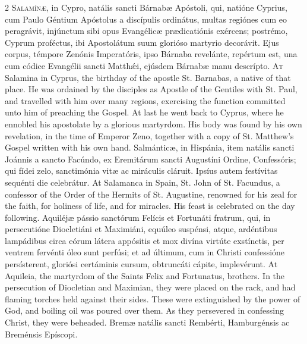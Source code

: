 \begin{paracol}{2}
\lettrine[lines=2]{S}{alamínæ,} in Cypro, 
 natális sancti Bárnabæ Apóstoli, qui, natióne Cyprius, cum Paulo Géntium 
 Apóstolus a discípulis ordinátus, multas regiónes cum eo peragrávit, 
 injúnctum sibi opus Evangélicæ prædicatiónis exércens; postrémo, Cyprum 
 proféctus, ibi Apostolátum suum glorióso martyrio decorávit. Ejus 
 corpus, témpore Zenónis Imperatóris, ipso Bárnaba revelánte, repértum est, 
 una cum códice Evangélii sancti Matthǽi, ejúsdem Bárnabæ manu descrípto.
\switchcolumn
{}
\lettrine[lines=2]{A}{t} Salamina in Cyprus, the birthday 
 of the apostle St. Barnabas, a native of that place. He was ordained 
 by the disciples as Apostle of the Gentiles with St. Paul, and travelled 
 with him over many regions, exercising the function committed unto him of 
 preaching the Gospel. At last he went back to Cyprus, where he 
 ennobled his apostolate by a glorious martyrdom. His body was found by 
 his own revelation, in the time of Emperor Zeno, together with a copy of St. 
 Matthew's Gospel written with his own hand.
\switchcolumn*
{}
Salmánticæ, in 
 Hispánia, item natális sancti Joánnis a sancto Facúndo, ex Eremitárum sancti 
 Augustíni Ordine, Confessóris; qui fídei zelo, sanctimónia vitæ ac miráculis 
 cláruit. Ipsíus autem festívitas sequénti die celebrátur.
\switchcolumn
{}
At Salamanca in Spain, St. John of St. Facundus, a confessor of the Order of the Hermits of St. Augustine, 
 renowned for his zeal for the faith, for holiness of life, and for miracles. 
 His feast is celebrated on the day following.
\switchcolumn*
{}
Aquiléjæ pássio 
 sanctórum Felícis et Fortunáti fratrum, qui, in persecutióne Diocletiáni et 
 Maximiáni, equúleo suspénsi, atque, ardéntibus lampádibus circa eórum látera 
 appósitis et mox divína virtúte exstínctis, per ventrem fervénti óleo sunt 
 perfúsi; et ad últimum, cum in Christi confessióne persísterent, gloriósi 
 certáminis cursum, obtruncáti cápite, implevérunt.
\switchcolumn
{}
At Aquileia, the martyrdom of the 
 Saints Felix and Fortunatus, brothers. In the persecution of 
 Diocletian and Maximian, they were placed on the rack, and had flaming 
 torches held against their sides. These were extinguished by the power 
 of God, and boiling oil was poured over them. As they persevered in 
 confessing Christ, they were beheaded.
\switchcolumn*
{}
Bremæ natális sancti 
 Rembérti, Hamburgénsis ac Breménsis Epíscopi.

\end{paracol}
